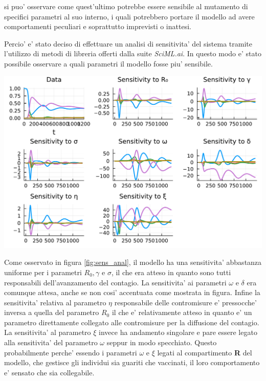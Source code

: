si puo' osservare come quest'ultimo potrebbe essere sensibile al mutamento di specifici 
parametri al suo interno, i quali potrebbero portare il modello ad avere comportamenti 
peculiari e soprattutto imprevisti o inattesi.

Percio' e' stato deciso di effettuare un analisi di sensitivita' del sistema tramite l'utilizzo 
di metodi di libreria offerti dalla suite \emph{SciML.ai}. In questo modo e' stato possibile 
osservare a quali parametri il modello fosse piu' sensibile. 

\begin{minipage}{\linewidth}
	\centering
	\includegraphics[width=\textwidth]{img/sa.pdf}
	\label{fig:sens_anal}
\end{minipage}

Come osservato in figura \ref{fig:sens_anal}, il modello ha una sensitivita' abbastanza 
uniforme per i parametri $R_0, \gamma$ e $\sigma$, il che era atteso in quanto sono tutti 
responsabili dell'avanzamento del contagio. La sensitivita' ai parametri $\omega$ e $\delta$ 
era comunque attesa, anche se non cosi' accentuata come mostrata in figura. Infine la sensitivita' 
relativa al parametro $\eta$ responsabile delle contromisure e' pressocche' inversa a quella del 
parametro $R_0$ il che e' relativamente atteso in quanto e' un parametro direttamente collegato 
alle contromisure per la diffusione del contagio. La sensitivita' al parametro $\xi$ invece ha 
andamento singolare e pare essere legato alla sensitivita' del parametro $\omega$ seppur in 
modo specchiato. Questo probabilmente perche' essendo i parametri $\omega$ e $\xi$ legati al 
compartimento \textbf{R} del modello, che gestisce gli individui sia guariti che vaccinati, 
il loro comportamento e' sensato che sia collegabile.

